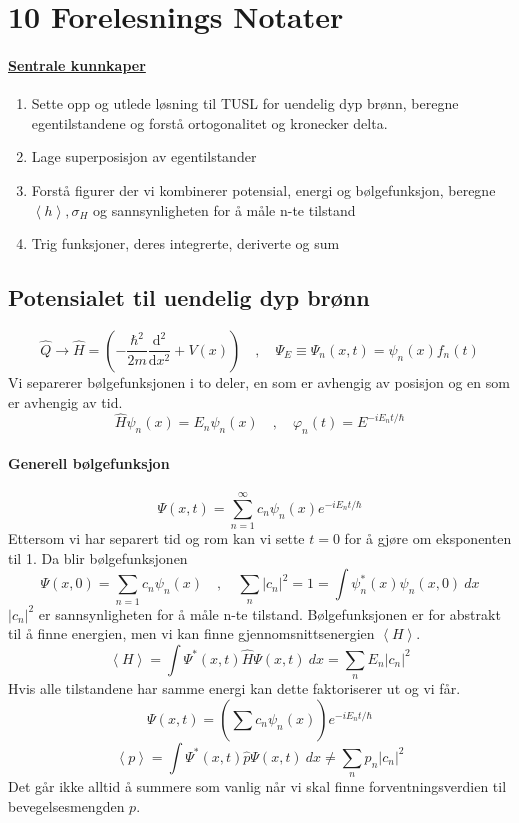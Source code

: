 \section{10 Forelesnings Notater}
\paragraph{\underline{Sentrale kunnkaper}}
\begin{enumerate}
    \item Sette opp og utlede løsning til TUSL for uendelig dyp brønn, beregne egentilstandene og forstå ortogonalitet og kronecker delta.
    \item Lage superposisjon av egentilstander
    \item Forstå figurer der vi kombinerer potensial, energi og bølgefunksjon, beregne $\left<h\right>, σ_{H}$ og sannsynligheten for å måle n-te tilstand
    \item Trig funksjoner, deres integrerte, deriverte og sum
\end{enumerate}

\subsection{Potensialet til uendelig dyp brønn}
\[
\hat{Q} → \hat{H} = \left(- \frac{ℏ^2}{2m}\frac{\mathrm{d}^2}{\mathrm{d}x^2} + V(x)\right) \quad , \quad Ψ_{E} ≡ Ψ_{n}(x,t) = ψ_n(x)f_n(t)
\]
Vi separerer bølgefunksjonen i to deler, en som er avhengig av posisjon og en som er avhengig av tid. 
\[
\hat{H}ψ_n(x) = E_nψ_n(x) \quad , \quad φ_n(t) = E^{-iE_{n} t / ℏ}
\]
\paragraph{Generell bølgefunksjon}
\[
Ψ(x,t) = \sum_{n=1}^{\infty}c_nψ_n(x)e^{-iE_nt/ℏ}
\]
Ettersom vi har separert tid og rom kan vi sette $t = 0$ for å gjøre om eksponenten til 1. Da blir bølgefunksjonen
\[
Ψ(x,0) = \sum_{n=1}^{}c_nψ_n(x) \quad , \quad ∑_{n}^{} \left|c_n\right|^2 = 1 = ∫ ψ^{*}_n(x)ψ_n(x,0)\ dx
\]
$\left|c_n\right|^2 $ er sannsynligheten for å måle n-te tilstand. Bølgefunksjonen er for abstrakt til å finne energien, men vi kan finne gjennomsnittsenergien $\left<H\right>$. 
\[
\left<H\right> = ∫ Ψ^{*}(x,t)\hat{H}Ψ(x,t)\ dx = ∑_{n}^{} E_n \left|c_n\right|^2
\]
Hvis alle tilstandene har samme energi kan dette faktoriserer ut og vi får. 
\[
Ψ(x,t) = \left(∑_{}^{} c_n ψ_n(x)\right)e^{-iE_nt/ℏ}
\]
\[
\left<p\right> = ∫ Ψ^{*}(x,t)\hat{p}Ψ(x,t)\ dx ≠  ∑_{n}^{} p_n \left|c_n\right|^2
\]
Det går ikke alltid å summere som vanlig når vi skal finne forventningsverdien til bevegelsesmengden $p$. 

